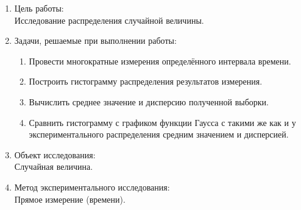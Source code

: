 \documentclass[12pt]{article}
\begin{document}
\begin{enumerate}
    \item Цель работы: \\
    Исследование распределения случайной величины.
    
    \item Задачи, решаемые при выполнении работы:
    \begin{enumerate}
        \item Провести многократные измерения определённого интервала времени.
        \item Построить гистограмму распределения результатов измерения.
        \item Вычислить среднее значение и дисперсию полученной выборки.
        \item Сравнить гистограмму с графиком функции Гаусса с такими же как и у экспериментального распределения средним значением и дисперсией.
    \end{enumerate} 

    \item Объект исследования: \\
    Случайная величина.

    \item Метод экспериментального исследования: \\
    Прямое измерение (времени).


\end{enumerate}
\end{document}
